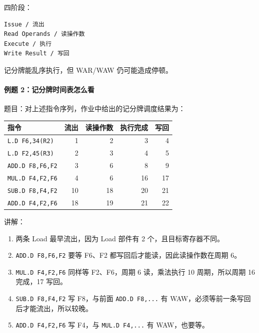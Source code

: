 \documentclass[
]{ctexart}
\newcommand{\passthrough}[1]{#1}
\newcounter{none} %
\providecommand{\tightlist}{%
  \setlength{\itemsep}{0pt}\setlength{\parskip}{0pt}}
\begin{document}
四阶段：

\begin{lstlisting}
Issue / 流出
Read Operands / 读操作数
Execute / 执行
Write Result / 写回
\end{lstlisting}

记分牌能乱序执行，但 WAR/WAW 仍可能造成停顿。

\paragraph{例题
2：记分牌时间表怎么看}\label{ux4f8bux9898-2ux8bb0ux5206ux724cux65f6ux95f4ux8868ux600eux4e48ux770b}

题目：对上述指令序列，作业中给出的记分牌调度结果为：

{\def\LTcaptype{none} %
\begin{longtable}[]{@{}lrrrr@{}}
\toprule\noalign{}
指令 & 流出 & 读操作数 & 执行完成 & 写回 \\
\midrule\noalign{}
\endhead
\bottomrule\noalign{}
\endlastfoot
\passthrough{\lstinline!L.D F6,34(R2)!} & 1 & 2 & 3 & 4 \\
\passthrough{\lstinline!L.D F2,45(R3)!} & 2 & 3 & 4 & 5 \\
\passthrough{\lstinline!ADD.D F8,F6,F2!} & 3 & 6 & 8 & 9 \\
\passthrough{\lstinline!MUL.D F4,F2,F6!} & 4 & 6 & 16 & 17 \\
\passthrough{\lstinline!SUB.D F8,F4,F2!} & 10 & 18 & 20 & 21 \\
\passthrough{\lstinline!ADD.D F4,F2,F6!} & 18 & 19 & 21 & 22 \\
\end{longtable}
}

讲解：

\begin{enumerate}
\def\labelenumi{\arabic{enumi}.}
\tightlist
\item
  两条 Load 最早流出，因为 Load 部件有 2 个，且目标寄存器不同。
\item
  \passthrough{\lstinline!ADD.D F8,F6,F2!} 要等 F6、F2
  都写回后才能读，因此读操作数在周期 6。
\item
  \passthrough{\lstinline!MUL.D F4,F2,F6!} 同样等 F2、F6，周期 6
  读，乘法执行 10 周期，所以周期 16 完成，17 写回。
\item
  \passthrough{\lstinline!SUB.D F8,F4,F2!} 写 F8，与前面
  \passthrough{\lstinline!ADD.D F8,...!} 有
  WAW，必须等前一条写回后才能流出，所以较晚。
\item
  \passthrough{\lstinline!ADD.D F4,F2,F6!} 写 F4，与
  \passthrough{\lstinline!MUL.D F4,...!} 有 WAW，也要等。
\end{enumerate}
\end{document}

